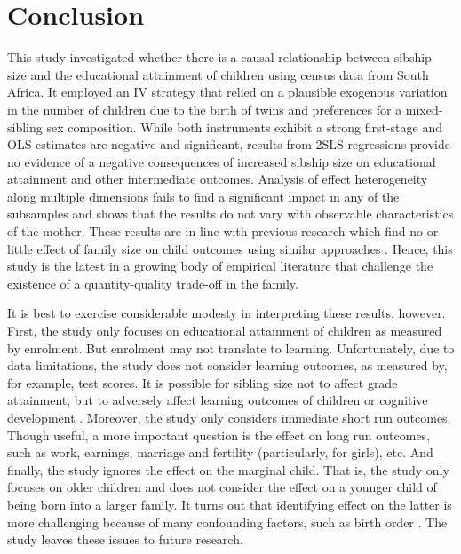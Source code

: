 \section{Conclusion}
\label{section:conclude}

This study investigated whether there is a causal relationship between sibship size and the educational attainment of children using census data from South Africa. It employed an IV strategy that relied on a plausible exogenous variation in the number of children due to the birth of twins and preferences for a mixed-sibling sex composition. While both instruments exhibit a strong first-stage and OLS estimates are negative and significant, results from 2SLS regressions provide no evidence of a negative consequences of increased sibship size on educational attainment and other intermediate outcomes. Analysis of effect heterogeneity along multiple dimensions fails to find a significant impact in any of the subsamples and shows that the results do not vary with observable characteristics of the mother. These results are in line with previous research which find no or little effect of family size on child outcomes using similar approaches \parencite[e.g.,][]{Black2005,Black2010,caceres-delpiano_impacts_2006,angrist_multiple_2010,bhalotra_twin_2020}. Hence, this study is the latest in a growing body of empirical literature that challenge the existence of a quantity-quality trade-off in the family.

It is best to exercise considerable modesty in interpreting these results, however. First, the study only focuses on educational attainment of children as measured by enrolment. But enrolment may not translate to learning. Unfortunately, due to data limitations, the study does not consider learning outcomes, as measured by, for example, test scores. It is possible for sibling size not to affect grade attainment, but to adversely affect learning outcomes of children or cognitive development \parencite{Black2010}. Moreover, the study only considers immediate short run outcomes. Though useful, a more important question is the effect on long run outcomes, such as work, earnings, marriage and fertility (particularly, for girls), etc. And finally, the study ignores the effect on the marginal child. That is, the study only focuses on older children and does not consider the effect on a younger child of being born into a larger family. It turns out that identifying effect on the latter is more challenging because of many confounding factors, such as birth order \parencite{Black2005}. The study leaves these issues to future research.  












